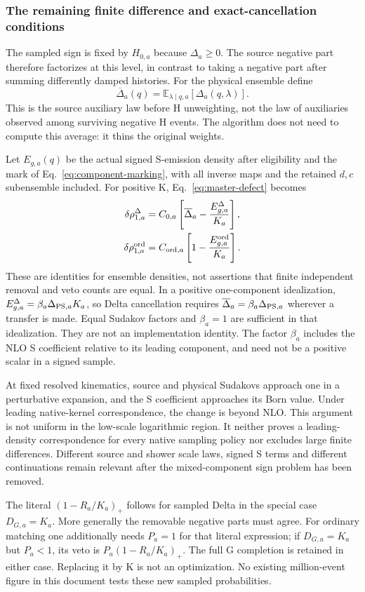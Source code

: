 \subsubsection{The remaining finite difference and exact-cancellation conditions}

The sampled sign is fixed by $H_{0,a}$ because $\Delta_a\geq0$.
The source negative part therefore factorizes at this level, in contrast
to taking a negative part after summing differently damped histories.
For the physical ensemble define
\begin{equation}
 \overline\Delta_a(q)
  =\mathbb E_{\lambda\mid q,a}[\Delta_a(q,\lambda)].
\end{equation}
This is the source auxiliary law before H unweighting, not the law of
auxiliaries observed among surviving negative H events. The algorithm
does not need to compute this average: it thins the original weights.

Let $E_{g,a}(q)$ be the actual signed S-emission density after eligibility
and the mark of Eq.~\eqref{eq:component-marking}, with all inverse maps
and the retained $d,c$ subensemble included. For positive K,
Eq.~\eqref{eq:master-defect} becomes
\begin{align}
 \delta\rho_{1,a}^{\Delta}
   &=C_{0,a}\left[\overline\Delta_a-\frac{E_{g,a}^{\Delta}}{K_a}\right],
 \label{eq:component-delta-defect}\\
 \delta\rho_{1,a}^{\rm ord}
   &=C_{{\rm ord},a}\left[1-\frac{E_{g,a}^{\rm ord}}{K_a}\right].
 \label{eq:component-ordinary-defect}
\end{align}
These are identities for ensemble densities, not assertions that finite
independent removal and veto counts are equal.
In a positive one-component idealization,
$E_{g,a}^{\Delta}=\beta_a\Delta_{{\rm PS},a}K_a$, so Delta cancellation
requires $\overline\Delta_a=\beta_a\Delta_{{\rm PS},a}$ wherever a
transfer is made. Equal Sudakov factors and $\beta_a=1$ are sufficient
in that idealization. They are not an implementation identity.
The factor $\beta_a$ includes the NLO S coefficient relative to its
leading component, and need not be a positive scalar in a signed sample.

At fixed resolved kinematics, source and physical Sudakovs approach one
in a perturbative expansion, and the S coefficient approaches its Born
value. Under leading native-kernel correspondence, the change is beyond
NLO. This argument is not uniform in the low-scale logarithmic region.
It neither proves a leading-density correspondence for every native
sampling policy nor excludes large finite differences. Different source
and shower scale laws, signed S terms and different continuations remain
relevant after the mixed-component sign problem has been removed.

The literal $(1-R_a/K_a)_+$ follows for sampled Delta in the special
case $D_{G,a}=K_a$. More generally the removable negative parts must
agree. For ordinary matching one additionally needs $P_a=1$ for that
literal expression; if $D_{G,a}=K_a$ but $P_a<1$, its veto is
$P_a(1-R_a/K_a)_+$. The full G completion is retained in either case.
Replacing it by K is not an optimization. No existing million-event
figure in this document tests these new sampled probabilities.
